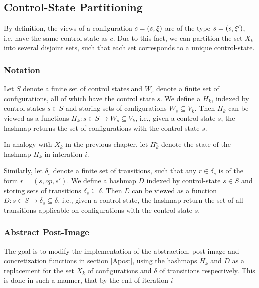 
\subsection{Control-State Partitioning}
By definition, the views of a configuration $c = (s, \xi)$ are of the type $s = (s, \xi')$, i.e. have the same control state as $c$. Due to this fact, we can partition the set $X_k$ into several disjoint sets, such that each set corresponds to a unique control-state.

\subsubsection{Notation}
Let $S$ denote a finite set of control states and $W_s$ denote a finite set of configurations, all of which have the control state $s$. We define a  $H_k$, indexed by control states $s \in S$ and storing sets of configurations $W_s \subseteq V_k$. Then $H_k$ can be viewed as a functions $H_k : s \in S \rightarrow W_s \subseteq V_k$, i.e., given a control state $s$, the hashmap returns the set of configurations with the control state $s$. 

In analogy with $X_k$ in the previous chapter, let $H_k^i$ denote the state of the hashmap $H_k$ in interation $i$.

Similarly, let $\delta_s$ denote a finite set of transitions, such that any $r \in \delta_s$ is of the form $r = (s, op, s')$. We define a hashmap $D$ indexed by control-state $s \in S$ and storing sets of transitions $\delta_s \subseteq \delta$. Then $D$ can be viewed as a function $D : s \in S \rightarrow \delta_s \subseteq \delta$, i.e., given a control state, the hashmap return the set of all transitions applicable on configurations with the control-state $s$.

\subsubsection{Abstract Post-Image}
The goal is to modify the implementation of the abstraction, post-image and concretization functions in section \ref{Apost}, using the hashmaps $H_k$ and $D$ as a replacement for the set $X_k$ of configurations and $\delta$ of transitions respectively. This is done in such a manner, that by the end of iteration $i$

